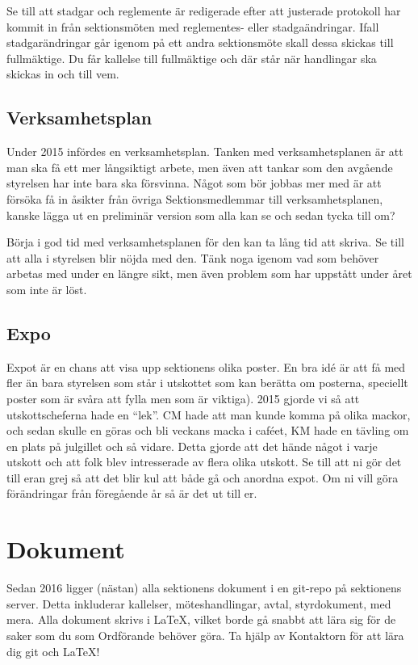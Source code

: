 \documentclass[10pt]{article}
\begin{document}
Se till att stadgar och reglemente är redigerade efter att justerade protokoll har kommit in från sektionsmöten med reglementes- eller stadgaändringar. Ifall stadgarändringar går igenom på ett andra sektionsmöte skall dessa skickas till fullmäktige. Du får kallelse till fullmäktige och där står när handlingar ska skickas in och till vem.

\subsection{Verksamhetsplan}

Under 2015 infördes en verksamhetsplan. Tanken med verksamhetsplanen är att man ska få ett mer långsiktigt arbete, men även att tankar som den avgående styrelsen har inte bara ska försvinna. Något som bör jobbas mer med är att försöka få in åsikter från övriga Sektionsmedlemmar till verksamhetsplanen, kanske lägga ut en preliminär version som alla kan se och sedan tycka till om?

Börja i god tid med verksamhetsplanen för den kan ta lång tid att skriva. Se till att alla i styrelsen blir nöjda med den. Tänk noga igenom vad som behöver arbetas med under en längre sikt, men även problem som har uppstått under året som inte är löst.

\subsection{Expo}

Expot är en chans att visa upp sektionens olika poster. En bra idé är att få med fler än bara styrelsen som står i utskottet som kan berätta om posterna, speciellt poster som är svåra att fylla men som är viktiga). 2015 gjorde vi så att utskottscheferna hade en ``lek''. CM hade att man kunde komma på olika mackor, och sedan skulle en göras och bli veckans macka i caféet, KM hade en tävling om en plats på julgillet och så vidare. Detta gjorde att det hände något i varje utskott och att folk blev intresserade av flera olika utskott. Se till att ni gör det till eran grej så att det blir kul att både gå och anordna expot. Om ni vill göra förändringar från föregående år så är det ut till er.

\section{Dokument}

Sedan 2016 ligger (nästan) alla sektionens dokument i en git-repo på sektionens server. Detta inkluderar kallelser, möteshandlingar, avtal, styrdokument, med mera. Alla dokument skrivs i \LaTeX, vilket borde gå snabbt att lära sig för de saker som du som Ordförande behöver göra. Ta hjälp av Kontaktorn för att lära dig git och \LaTeX!
\end{document}
